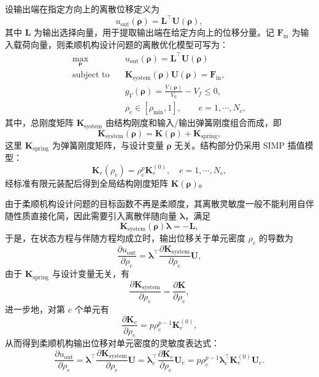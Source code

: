 设输出端在指定方向上的离散位移定义为
\[
u_{\text{out}}(\boldsymbol{\rho}) = \boldsymbol{L}^{\top}\boldsymbol{U}(\boldsymbol{\rho}),
\]
其中 $\boldsymbol{L}$ 为输出选择向量，用于提取输出端在给定方向上的位移分量。记 $\boldsymbol{F}_{\text{in}}$ 为输入载荷向量，则柔顺机构设计问题的离散优化模型可写为：
\begin{equation} \label{eq:ch3_discrete_model_mechanism}
	\begin{aligned}
		\max_{\boldsymbol{\rho}}\quad & u_{\text{out}}(\boldsymbol{\rho}) = \boldsymbol{L}^{\top}\boldsymbol{U}(\boldsymbol{\rho})\\
		\text{subject to}\quad & \boldsymbol{K}_{\text{system}}(\boldsymbol{\rho})\boldsymbol{U}(\boldsymbol{\rho}) = \boldsymbol{F}_{\text{in}},\\
		& g_V(\boldsymbol{\rho}) = \frac{V(\boldsymbol{\rho})}{V_0} - V_f\leq 0,\\ 
		& \rho_e\in[\rho_{\min},1],\qquad e=1,\cdots,N_c, 
	\end{aligned}
\end{equation}
其中，总刚度矩阵 $\boldsymbol{K}_{\text{system}}$ 由结构刚度和输入/输出弹簧刚度组合而成，即
\[
\boldsymbol{K}_{\text{system}}(\boldsymbol{\rho}) = \boldsymbol{K}(\boldsymbol{\rho}) + \boldsymbol{K}_{\text{spring}},
\]
这里 $\boldsymbol{K}_{\text{spring}}$ 为弹簧刚度矩阵，与设计变量 $\boldsymbol{\rho}$ 无关。结构部分仍采用 SIMP 插值模型：
\[
\boldsymbol{K}_e(\rho_e) = \rho_e^p\boldsymbol{K}_e^{(0)},\quad e=1,\cdots,N_c,
\]
经标准有限元装配后得到全局结构刚度矩阵 $\boldsymbol{K}(\boldsymbol{\rho})$。

由于柔顺机构设计问题的目标函数不再是柔顺度，其离散灵敏度一般不能利用自伴随性质直接化简，因此需要引入离散伴随向量 $\boldsymbol{\lambda}$，满足
\[
\boldsymbol{K}_{\text{system}}(\boldsymbol{\rho})\boldsymbol{\lambda} = -\boldsymbol{L},
\]
于是，在状态方程与伴随方程均成立时，输出位移关于单元密度 $\rho_e$ 的导数为
\[
\frac{\partial u_{\text{out}}}{\partial \rho_e}  = \boldsymbol{\lambda}^{\top} \frac{\partial \boldsymbol{K}_{\text{system}}}{\partial \rho_e} \boldsymbol{U},
\]
由于 $\boldsymbol{K}_{\text{spring}}$ 与设计变量无关，有
\[
\frac{\partial\boldsymbol{K}_{\text{system}}}{\partial \rho_e} = \frac{\partial\boldsymbol{K}}{\partial \rho_e},
\]
进一步地，对第 $e$ 个单元有
\[
\frac{\partial\boldsymbol{K}_e}{\partial \rho_e} = p\rho_e^{p-1}\boldsymbol{K}_e^{(0)},
\]
从而得到柔顺机构输出位移对单元密度的灵敏度表达式：
\begin{equation} \label{eq:ch3_sens_mechanism}
	\frac{\partial u_{\text{out}}}{\partial \rho_e} = \boldsymbol{\lambda}^{\top} \frac{\partial \boldsymbol{K}_{\text{system}}}{\partial \rho_e} \boldsymbol{U} = \boldsymbol{\lambda}_e^{\top}\frac{\partial\boldsymbol{K}_e}{\partial\rho_e}\boldsymbol{U}_e = p\rho_e^{p-1} \boldsymbol{\lambda}_e^{\top} \boldsymbol{K}_e^{(0)} \boldsymbol{U}_e.
\end{equation}


